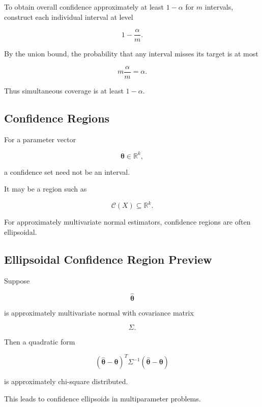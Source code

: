 To obtain overall confidence approximately at least \(1-\alpha\) for
\(m\) intervals, construct each individual interval at level

\[
\boxed{
1-\frac{\alpha}{m}.
}
\]

By the union bound, the probability that any interval misses its target
is at most

\[
m\frac{\alpha}{m}
=
\alpha.
\]

Thus simultaneous coverage is at least \(1-\alpha\).

\subsection{Confidence Regions}
\label{subsec:confidence-regions}

For a parameter vector

\[
\boldsymbol{\theta}
\in
\mathbb{R}^k,
\]

a confidence set need not be an interval.

It may be a region such as

\[
\boxed{
\mathcal{C}(X)
\subseteq
\mathbb{R}^k.
}
\]

For approximately multivariate normal estimators, confidence regions are
often ellipsoidal.

\subsection{Ellipsoidal Confidence Region Preview}
\label{subsec:ellipsoidal-confidence-region}

Suppose

\[
\widehat{\boldsymbol{\theta}}
\]

is approximately multivariate normal with covariance matrix

\[
\Sigma.
\]

Then a quadratic form

\[
\boxed{
(
\widehat{\boldsymbol{\theta}}
-
\boldsymbol{\theta}
)^T
\Sigma^{-1}
(
\widehat{\boldsymbol{\theta}}
-
\boldsymbol{\theta}
)
}
\]

is approximately chi-square distributed.

This leads to confidence ellipsoids in multiparameter problems.

